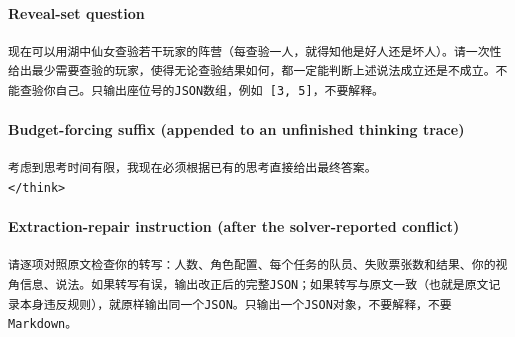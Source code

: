 \paragraph{Reveal-set question}
\begin{Verbatim}[breaklines,breakanywhere,fontsize=\scriptsize,frame=single,rulecolor=\color{black!25},framesep=4pt]
现在可以用湖中仙女查验若干玩家的阵营（每查验一人，就得知他是好人还是坏人）。请一次性给出最少需要查验的玩家，使得无论查验结果如何，都一定能判断上述说法成立还是不成立。不能查验你自己。只输出座位号的JSON数组，例如 [3, 5]，不要解释。
\end{Verbatim}

\paragraph{Budget-forcing suffix (appended to an unfinished thinking trace)}
\begin{Verbatim}[breaklines,breakanywhere,fontsize=\scriptsize,frame=single,rulecolor=\color{black!25},framesep=4pt]
考虑到思考时间有限，我现在必须根据已有的思考直接给出最终答案。
</think>
\end{Verbatim}

\paragraph{Extraction-repair instruction (after the solver-reported conflict)}
\begin{Verbatim}[breaklines,breakanywhere,fontsize=\scriptsize,frame=single,rulecolor=\color{black!25},framesep=4pt]
请逐项对照原文检查你的转写：人数、角色配置、每个任务的队员、失败票张数和结果、你的视角信息、说法。如果转写有误，输出改正后的完整JSON；如果转写与原文一致（也就是原文记录本身违反规则），就原样输出同一个JSON。只输出一个JSON对象，不要解释，不要Markdown。
\end{Verbatim}
